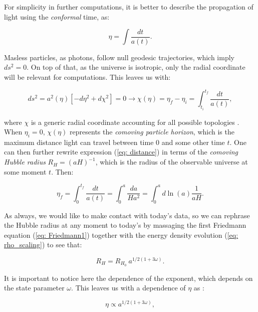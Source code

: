\documentclass[11pt, a4paper]{article} %
\begin{document}
For simplicity in further computations, it is better to describe the propagation of light using the \textit{conformal} time, as:

\begin{equation}
	\eta = \int \frac{dt}{a(t)}.
\end{equation}

Masless particles, as photons, follow null geodesic trajectories, which imply $ds^{2} = 0$. On top of that, as the universe is isotropic, only the radial coordinate will be relevant for computations. This leaves us with:

\begin{equation}\label{eq: distance}
	ds^{2} = a^{2}(\eta)\left[-d\eta^{2} + d\chi^{2}\right]=0 \longrightarrow \chi(\eta) = \eta_{f} - \eta_{i} = \int^{t_{f}}_{t_{i}} \frac{dt}{a(t)},
\end{equation}

where $\chi$ is a generic radial coordinate accounting for all possible topologies \cite{baumann2009tasi}. When $\eta_{i} =0$, $\chi(\eta)$ represents the \textit{comoving particle horizon}, which is the maximum distance light can travel between time 0 and some other time $t$. One can then further rewrite expression (\ref{eq: distance}) in terms of the \textit{comoving Hubble radius} $R_{H} = (a H)^{-1}$, which is the radius of the observable universe at some moment $t$. Then:

\begin{equation}
	\eta_{f} = \int^{t_{f}}_{0} \frac{dt}{a(t)} = \int^{a}_{0} \frac{da}{H a^{2}} = \int^{a}_{0} d \ln(a) \frac{1}{a H}.
\end{equation}

As always, we would like to make contact with today's data, so we can rephrase the Hubble radius at any moment to today's by massaging the first Friedmann equation (\ref{eq: Friedmann1}) together with the energy density evolution (\ref{eq: rho_scaling}) to see that:

\begin{equation}\label{eq: hubble_rad}
	R_{H} = R_{H_{0}} \: a ^{1/2(1+ 3 \omega)}.
\end{equation}

It is important to notice here the dependence of the exponent, which depends on the state parameter $\omega$. This leaves us with a dependence of $\eta$ as :

\begin{equation}
	\eta \propto a^{1/2\left(1+3\omega\right)},
\end{equation}
\end{document}
